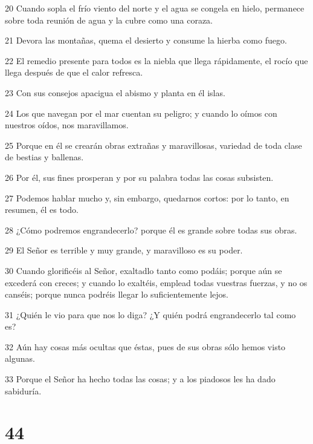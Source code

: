 \par 20 Cuando sopla el frío viento del norte y el agua se congela en hielo, permanece sobre toda reunión de agua y la cubre como una coraza.
\par 21 Devora las montañas, quema el desierto y consume la hierba como fuego.
\par 22 El remedio presente para todos es la niebla que llega rápidamente, el rocío que llega después de que el calor refresca.
\par 23 Con sus consejos apacigua el abismo y planta en él islas.
\par 24 Los que navegan por el mar cuentan su peligro; y cuando lo oímos con nuestros oídos, nos maravillamos.
\par 25 Porque en él se crearán obras extrañas y maravillosas, variedad de toda clase de bestias y ballenas.
\par 26 Por él, sus fines prosperan y por su palabra todas las cosas subsisten.
\par 27 Podemos hablar mucho y, sin embargo, quedarnos cortos: por lo tanto, en resumen, él es todo.
\par 28 ¿Cómo podremos engrandecerlo? porque él es grande sobre todas sus obras.
\par 29 El Señor es terrible y muy grande, y maravilloso es su poder.
\par 30 Cuando glorificéis al Señor, exaltadlo tanto como podáis; porque aún se excederá con creces; y cuando lo exaltéis, emplead todas vuestras fuerzas, y no os canséis; porque nunca podréis llegar lo suficientemente lejos.
\par 31 ¿Quién le vio para que nos lo diga? ¿Y quién podrá engrandecerlo tal como es?
\par 32 Aún hay cosas más ocultas que éstas, pues de sus obras sólo hemos visto algunas.
\par 33 Porque el Señor ha hecho todas las cosas; y a los piadosos les ha dado sabiduría.

\chapter{44}

